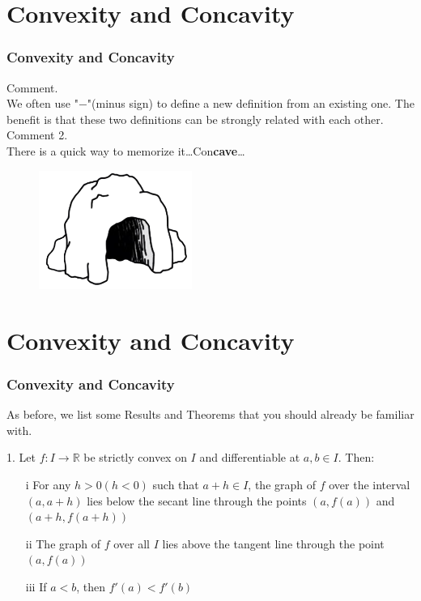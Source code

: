\documentclass[12pt, t]{beamer}
\begin{document}
\section{Convexity and Concavity}
\begin{frame}
    \frametitle{Convexity and Concavity}
Comment. \\
\vspace{0.5em}
\hspace{1em}
We often use "$-$"(minus sign) to define a new definition from an existing one. The benefit is that these two definitions can 
be strongly related with each other.\\
\vspace{1em}
Comment 2.\\
\hspace{1em}
There is a quick way to memorize it\dots\hspace{2em}Con\textbf{cave}\dots
\begin{figure}[H]
    \centering
    \includegraphics[width=5cm]{Figures/Concave.png}
\end{figure}
\end{frame}


\section{Convexity and Concavity}
\begin{frame}
    \frametitle{Convexity and Concavity}
As before, we list some Results and Theorems that you should already be familiar with.\\
\vspace{1em}

1. Let $f:I\rightarrow\mathbb{R}$ be strictly convex on $I$ and differentiable at $a,b\in I$. Then:
\begin{enumerate}
    \item[i] For any $h>0(h<0)$ such that $a+h\in I$, the graph of $f$ over the interval $(a,a+h)$ lies below the secant line through the 
        points $(a,f(a))$ and $(a+h, f(a+h))$
    \item[ii] The graph of $f$ over all $I$ lies above the tangent line through the point $(a, f(a))$
    \item[iii] If $a<b$, then $f'(a)<f'(b)$
\end{enumerate}
\end{frame}
\end{document}
